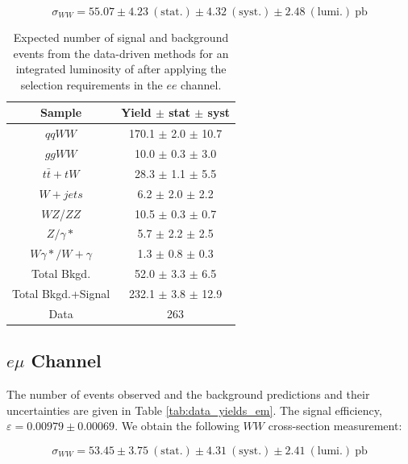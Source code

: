 \begin{equation*}
\sigma_{WW}  = 55.07 \pm 4.23~\mathrm{(stat.)} \pm 4.32~\mathrm{(syst.)} \pm 2.48~\mathrm{(lumi.)~pb}
\end{equation*}

\begin{table}[ht!]
  \begin{center}
  \begin{tabular} {|c|c|}
\hline
Sample                & Yield $\pm$ stat $\pm$ syst \\ \hline \hline
$qqWW$                & 170.1 $\pm$  2.0 $\pm$ 10.7  \\ \hline
$ggWW$                & 10.0 $\pm$  0.3 $\pm$  3.0  \\ \hline
$t\bar{t} + tW$      & 28.3 $\pm$  1.1 $\pm$  5.5  \\ \hline
$W+jets$              &  6.2 $\pm$  2.0 $\pm$  2.2  \\ \hline
$WZ$/$ZZ$             & 10.5 $\pm$  0.3 $\pm$  0.7  \\ \hline
$Z/\gamma*$          &  5.7 $\pm$  2.2 $\pm$  2.5  \\ \hline
$W\gamma*/W+\gamma$ &  1.3 $\pm$  0.8 $\pm$  0.3  \\ \hline \hline
Total Bkgd.           & 52.0 $\pm$  3.3 $\pm$  6.5  \\ \hline \hline
Total Bkgd.+Signal    & 232.1 $\pm$  3.8 $\pm$ 12.9  \\ \hline \hline
Data                  & 263 \\ \hline
\end{tabular}
  \caption{Expected number of signal and background events from the data-driven methods for
  an integrated luminosity of \intlumi after applying the selection requirements in the $ee$ channel.}
   \label{tab:data_yields_ee}
  \end{center}
\end{table}

%
%
%
\subsection{$e \mu$ Channel}

The number of events observed and the background predictions and their uncertainties are
given in Table \ref{tab:data_yields_em}.
The signal efficiency,  $\varepsilon = 0.00979 \pm 0.00069$.
We obtain the following $WW$ cross-section measurement:

\begin{equation*}
\sigma_{WW}  = 53.45 \pm 3.75~\mathrm{(stat.)} \pm 4.31~\mathrm{(syst.)} \pm 2.41~\mathrm{(lumi.)~pb} 
\end{equation*}

